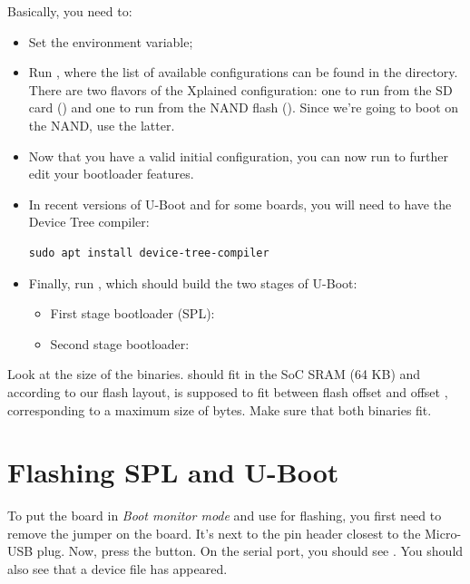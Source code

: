 Basically, you need to:

\begin{itemize}

\item Set the  environment variable;

\item Run , where the list of available
  configurations can be found in the  directory. There
  are two flavors of the Xplained configuration: one to run from the
  SD card () and one to run from the NAND
  flash (). Since we're going to boot
  on the NAND, use the latter.

\item Now that you have a valid initial configuration, you can now
  run  to further edit your bootloader features.

\item In recent versions of U-Boot and for some boards, you will
  need to have the Device Tree compiler:

\begin{verbatim}
sudo apt install device-tree-compiler
\end{verbatim}

\item Finally, run , which should build the two stages of U-Boot:
\begin{itemize}
  \item First stage bootloader (SPL): 
  \item Second stage bootloader: 
\end{itemize}

\end{itemize}

Look at the size of the binaries.  should fit
in the SoC SRAM (64 KB) and according to our flash layout, 
is supposed to fit between flash offset  and offset ,
corresponding to a maximum size of  bytes.  Make sure that
both binaries fit.

\section{Flashing SPL and U-Boot}

To put the board in {\em Boot monitor mode} and use  for
flashing, you first need to remove the  jumper on the board.
It's next to the pin header closest to the Micro-USB plug.
Now, press the  button.  On the serial port, you should see
. You should also see that a  device
file has appeared.

